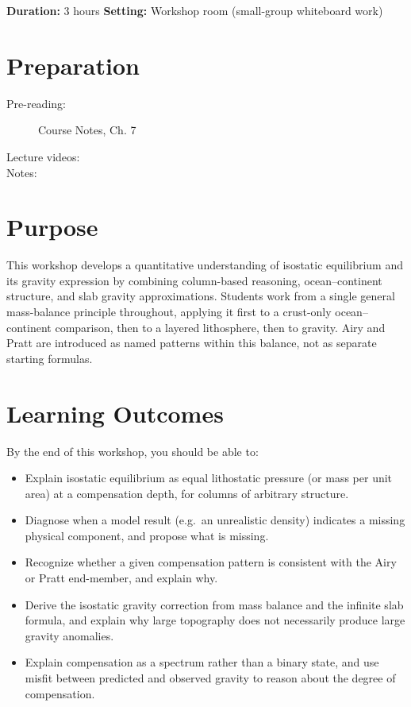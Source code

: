 
\workshopstart

\vspace{-0.75em}
\noindent\textbf{Duration:} 3 hours \hfill \textbf{Setting:} Workshop room (small-group whiteboard work)

\section*{Preparation}

\begin{description}
  \item[Pre-reading:] Course Notes, Ch. 7
  \item[Lecture videos:]
  \item[Notes:]
\end{description}

\section*{Purpose}

This workshop develops a quantitative understanding of isostatic equilibrium and its gravity expression by combining column-based reasoning, ocean--continent structure, and slab gravity approximations. Students work from a single general mass-balance principle throughout, applying it first to a crust-only ocean--continent comparison, then to a layered lithosphere, then to gravity. Airy and Pratt are introduced as named patterns within this balance, not as separate starting formulas.

\section*{Learning Outcomes}

By the end of this workshop, you should be able to:

\begin{itemize}
    \item Explain isostatic equilibrium as equal lithostatic pressure (or mass per unit area) at a compensation depth, for columns of arbitrary structure.
    \item Diagnose when a model result (e.g.\ an unrealistic density) indicates a missing physical component, and propose what is missing.
    \item Recognize whether a given compensation pattern is consistent with the Airy or Pratt end-member, and explain why.
    \item Derive the isostatic gravity correction from mass balance and the infinite slab formula, and explain why large topography does not necessarily produce large gravity anomalies.
    \item Explain compensation as a spectrum rather than a binary state, and use misfit between predicted and observed gravity to reason about the degree of compensation.
\end{itemize}


